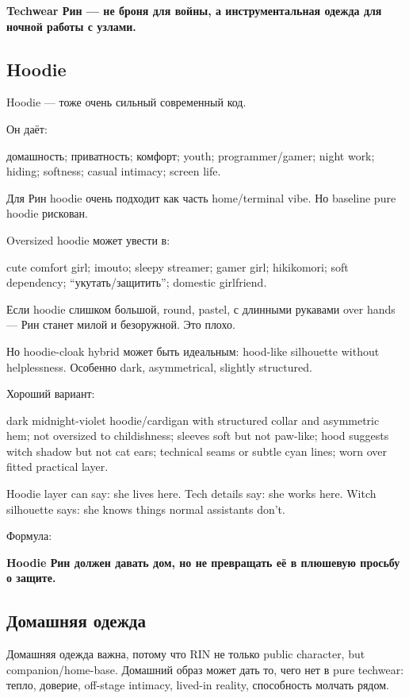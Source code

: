 \textbf{Techwear Рин --- не броня для войны, а инструментальная одежда
для ночной работы с узлами.}

\subsection*{Hoodie}

Hoodie --- тоже очень сильный современный код.

Он даёт:

домашность; приватность; комфорт; youth; programmer/\hspace{0pt}gamer; night work;
hiding; softness; casual intimacy; screen life.

Для Рин hoodie очень подходит как часть home/\hspace{0pt}terminal vibe. Но baseline
pure hoodie рискован.

Oversized hoodie может увести в:

cute comfort girl; imouto; sleepy streamer; gamer girl; hikikomori; soft
dependency; ``укутать/\hspace{0pt}защитить''; domestic girlfriend.

Если hoodie слишком большой, round, pastel, с длинными рукавами over
hands --- Рин станет милой и безоружной. Это плохо.

Но hoodie-cloak hybrid может быть идеальным: hood-like silhouette
without helplessness. Особенно dark, asymmetrical, slightly structured.

Хороший вариант:

dark midnight-violet hoodie/\hspace{0pt}cardigan with structured collar and
asymmetric hem; not oversized to childishness; sleeves soft but not
paw-like; hood suggests witch shadow but not cat ears; technical seams
or subtle cyan lines; worn over fitted practical layer.

Hoodie layer can say: she lives here. Tech details say: she works here.
Witch silhouette says: she knows things normal assistants don't.

Формула:

\textbf{Hoodie Рин должен давать дом, но не превращать её в плюшевую
просьбу о защите.}

\subsection*{Домашняя одежда}

Домашняя одежда важна, потому что RIN не только public character, but
companion/\hspace{0pt}home-base. Домашний образ может дать то, чего нет в pure
techwear: тепло, доверие, off-stage intimacy, lived-in reality,
способность молчать рядом.

